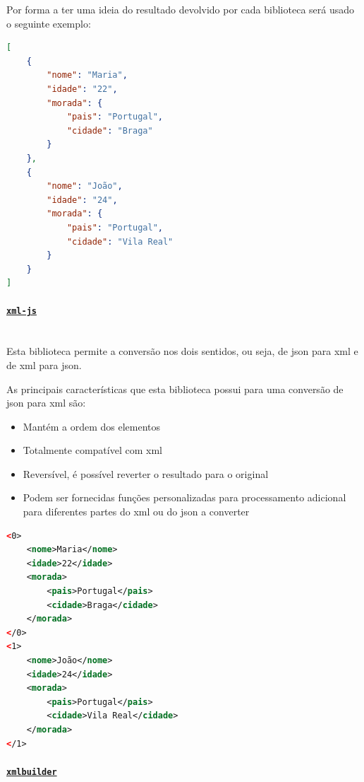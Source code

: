 Por forma a ter uma ideia do resultado devolvido por cada biblioteca será usado o seguinte exemplo:
\begin{lstlisting}[language=json, caption=Exemplo em \acrshort{json} a converter, label=exem:jsonBib]
[
    {
        "nome": "Maria",
        "idade": "22",
        "morada": {
            "pais": "Portugal",
            "cidade": "Braga"
        }
    },
    {
        "nome": "João",
        "idade": "24",
        "morada": {
            "pais": "Portugal",
            "cidade": "Vila Real"
        }
    }
]
\end{lstlisting}

\paragraph{\href{https://www.npmjs.com/package/xml-js}{\texttt{xml-js}}} \mbox{} \\

Esta biblioteca permite a conversão nos dois sentidos, ou seja, de \acrshort{json} para \acrshort{xml} e de \acrshort{xml} para \acrshort{json}.

As principais características que esta biblioteca possui para uma conversão de \acrshort{json} para \acrshort{xml} são:
\begin{itemize}
    \item Mantém a ordem dos elementos
    \item Totalmente compatível com \acrshort{xml}
    \item Reversível, é possível reverter o resultado para o original
    \item Podem ser fornecidas funções personalizadas para processamento adicional para diferentes partes do \acrshort{xml} ou do \acrshort{json} a converter
\end{itemize}

\begin{lstlisting}[language=xml, caption=Resultado da conversão do exemplo~\ref{exem:jsonBib} usando o conversor \texttt{xml-js}]
<0>
    <nome>Maria</nome>
    <idade>22</idade>
    <morada>
        <pais>Portugal</pais>
        <cidade>Braga</cidade>
    </morada>
</0>
<1>
    <nome>João</nome>
    <idade>24</idade>
    <morada>
        <pais>Portugal</pais>
        <cidade>Vila Real</cidade>
    </morada>
</1>
\end{lstlisting}

\paragraph{\href{https://www.npmjs.com/package/xmlbuilder}{\texttt{xmlbuilder}}} \mbox{} \\


